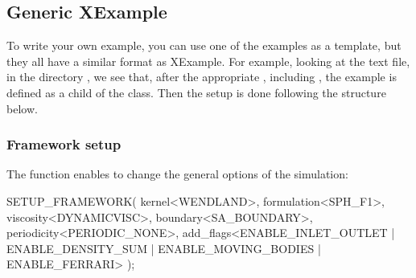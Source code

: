 \documentclass{../GPUSPHtemplate}
\begin{document}
\subsection{Generic XExample}

To write your own example, you can use one of the examples as a template, 
but they all have a similar format as XExample.  
For example, looking at the text file,  in the directory 
, we see that, after the appropriate , 
including , the example is defined as a 
child of the  class.  
Then the setup is done following the structure below.


\subsubsection{Framework setup}

The  function enables to change the
 general options of the simulation:
\begin{ccode}
  SETUP_FRAMEWORK(
    kernel<WENDLAND>,
    formulation<SPH_F1>,
    viscosity<DYNAMICVISC>,
    boundary<SA_BOUNDARY>,
    periodicity<PERIODIC_NONE>,
    add_flags<ENABLE_INLET_OUTLET | ENABLE_DENSITY_SUM 
        | ENABLE_MOVING_BODIES | ENABLE_FERRARI>
  );
\end{ccode}
\end{document}
